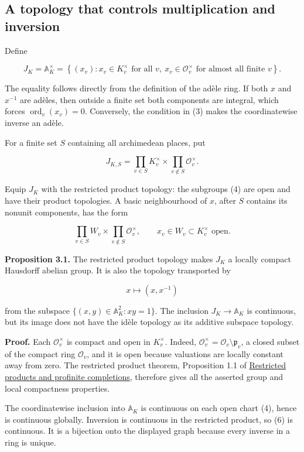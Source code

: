 \documentclass[
  english,
  11pt,
  a4paper,
]{article}
\begin{document}
\subsection{A topology that controls multiplication and
inversion}\label{NT-ADL-03--a-topology-that-controls-multiplication-and-inversion}

Define

\[J_K=\mathbb A_K^\times
=\left\{(x_v):x_v\in K_v^\times\text{ for all }v,
\ x_v\in\mathcal O_v^\times\text{ for almost all finite }v\right\}.
\tag{3}\]

The equality follows directly from the definition of the adèle ring. If
both \(x\) and \(x^{-1}\) are adèles, then outside a finite set both
components are integral, which forces \(\operatorname{ord}_v(x_v)=0\).
Conversely, the condition in (3) makes the coordinatewise inverse an
adèle.

For a finite set \(S\) containing all archimedean places, put

\[J_{K,S}=\prod_{v\in S}K_v^\times
\times\prod_{v\notin S}\mathcal O_v^\times.
\tag{4}\]

Equip \(J_K\) with the restricted product topology: the subgroups (4)
are open and have their product topologies. A basic neighbourhood of
\(x\), after \(S\) contains its nonunit components, has the form

\[\prod_{v\in S}W_v\times\prod_{v\notin S}\mathcal O_v^\times,
\qquad x_v\in W_v\subset K_v^\times\text{ open}.
\tag{5}\]

\textbf{Proposition 3.1.} The restricted product topology makes \(J_K\)
a locally compact Hausdorff abelian group. It is also the topology
transported by

\[x\longmapsto (x,x^{-1})
\tag{6}\]

from the subspace \(\{(x,y)\in\mathbb A_K^2:xy=1\}\). The inclusion
\(J_K\to\mathbb A_K\) is continuous, but its image does not have the
idèle topology as its additive subspace topology.

\textbf{Proof.} Each \(\mathcal O_v^\times\) is compact and open in
\(K_v^\times\). Indeed,
\(\mathcal O_v^\times=\mathcal O_v\setminus\mathfrak p_v\), a closed
subset of the compact ring \(\mathcal O_v\), and it is open because
valuations are locally constant away from zero. The restricted product
theorem, Proposition 1.1 of \hyperref[NT-ADL-01]{Restricted products and
profinite completions}, therefore gives all the asserted group and local
compactness properties.

The coordinatewise inclusion into \(\mathbb A_K\) is continuous on each
open chart (4), hence is continuous globally. Inversion is continuous in
the restricted product, so (6) is continuous. It is a bijection onto the
displayed graph because every inverse in a ring is unique.
\end{document}
